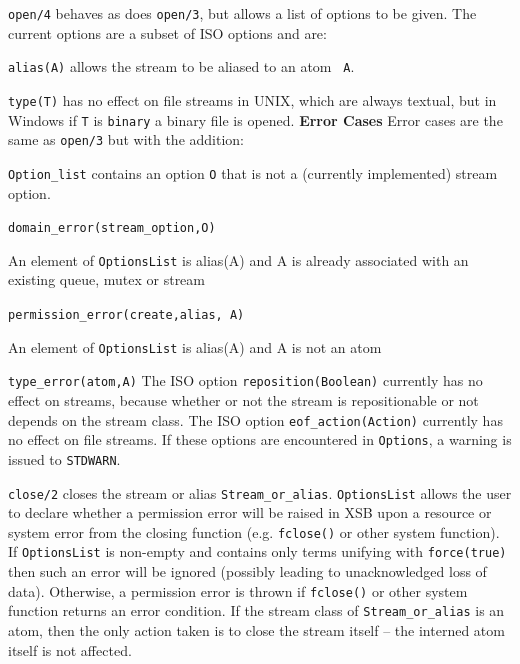 \begin{description}
%
{\tt open/4} behaves as does {\tt open/3}, but allows a list of
options to be given.  The current options are a subset of ISO options
and are:
\bi
\item {\tt alias(A)} allows the stream to be aliased to an atom {\tt
  A}.
%
\item {\tt type(T)} has no effect on file streams in UNIX, which are
  always textual, but in Windows if {\tt T} is {\tt binary} a binary
  file is opened.
\ei
%
{\bf Error Cases}  Error cases are the same as {\tt open/3} but with
the addition: 
\bi
\item {\tt Option\_list} contains an option {\tt O} that is not a
  (currently implemented) stream option.  
\bi
\item {\tt domain\_error(stream\_option,O)}
\ei
\item An element of {\tt OptionsList} is alias(A) and A is already
  associated with an existing
  queue, mutex or stream 
\bi
\item {\tt permission\_error(create,alias, A)}
\ei
\item An element of {\tt OptionsList} is alias(A) and A is not an atom
\bi
\item {\tt type\_error(atom,A)}
\ei
\ei
%
\compatibility 
%
The ISO option {\tt reposition(Boolean)} currently has no effect on
streams, because whether or not the stream is repositionable or not
depends on the stream class.  The ISO option {\tt eof\_action(Action)}
currently has no effect on file streams.  If these options are
encountered in {\tt Options}, a warning is issued to {\tt STDWARN}.

%
{\tt close/2} closes the stream or alias {\tt Stream\_or\_alias}.
{\tt OptionsList} allows the user to declare whether a permission
error will be raised in XSB upon a resource or system error from the
closing function (e.g. {\tt fclose()} or other system function).  If
{\tt OptionsList} is non-empty and contains only terms unifying with
{\tt force(true)} then such an error will be ignored (possibly leading
to unacknowledged loss of data).  Otherwise, a permission error is
thrown if {\tt fclose()} or other system function returns an error
condition.  If the stream class of {\tt Stream\_or\_alias} is an atom,
then the only action taken is to close the stream itself -- the
interned atom itself is not affected.


\end{description}
